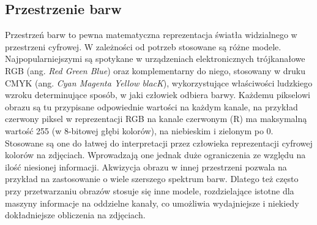 \subsection{Przestrzenie barw}
\label{sec:colorSpace}
Przestrzeń barw to pewna matematyczna reprezentacja światła widzialnego w przestrzeni cyfrowej. W zależności od potrzeb stosowane są różne modele. Najpopularniejszymi są spotykane w urządzeniach elektronicznych trójkanałowe RGB (ang. \textit{Red Green Blue}) oraz komplementarny do niego, stosowany w druku CMYK (ang. \textit{Cyan Magenta Yellow blacK}), wykorzystujące właściwości ludzkiego wzroku determinujące sposób, w jaki człowiek odbiera barwy. Każdemu pikselowi obrazu są tu przypisane odpowiednie wartości na każdym kanale, na przykład czerwony piksel w reprezentacji RGB na kanale czerwonym (R) ma maksymalną wartość 255 (w 8-bitowej głębi kolorów), na niebieskim i zielonym po 0. Stosowane są one do łatwej do interpretacji przez człowieka reprezentacji cyfrowej kolorów na zdjęciach. Wprowadzają one jednak duże ograniczenia ze względu na ilość niesionej informacji. Akwizycja obrazu w innej przestrzeni pozwala na przykład na zastosowanie o wiele szerszego spektrum barw. Dlatego też często przy przetwarzaniu obrazów stosuje się inne modele, rozdzielające istotne dla maszyny informacje na oddzielne kanały, co umożliwia wydajniejsze i niekiedy dokładniejsze obliczenia na zdjęciach.
